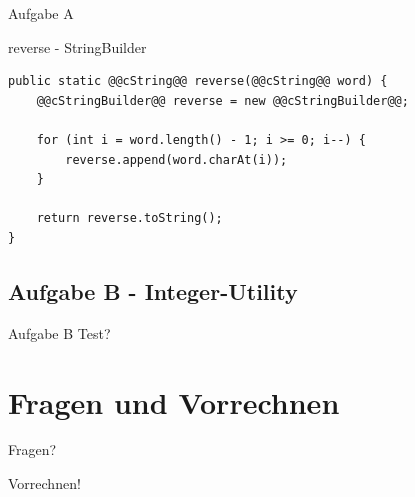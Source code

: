 \documentclass[aspectratio=169]{beamer}
\begin{document}
\begin{frame}[fragile]{Aufgabe A}
  \begin{block}{reverse - StringBuilder}
    \begin{lstlisting}
public static @@cString@@ reverse(@@cString@@ word) {
    @@cStringBuilder@@ reverse = new @@cStringBuilder@@;

    for (int i = word.length() - 1; i >= 0; i--) {
        reverse.append(word.charAt(i));
    }

    return reverse.toString();
}
    \end{lstlisting}
  \end{block}
\end{frame}

\subsection{Aufgabe B - Integer-Utility}

\begin{frame}[fragile]{Aufgabe B}
  Test?
\end{frame}

\section{Fragen und Vorrechnen}

\begin{frame}
  \begin{center}\LARGE Fragen?\end{center}
\end{frame}

\begin{frame}
  \begin{center}\LARGE Vorrechnen!\end{center}
\end{frame}
\end{document}
